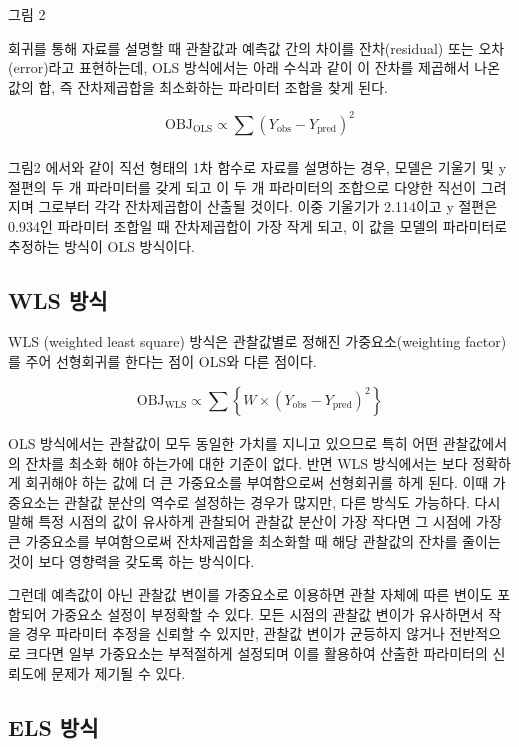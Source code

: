 \documentclass[
  10pt,
]{krantz}
\begin{document}
그림 2

회귀를 통해 자료를 설명할 때 관찰값과 예측값 간의 차이를 잔차(residual) 또는 오차(error)라고 표현하는데, OLS
방식에서는 아래 수식과 같이 이 잔차를 제곱해서 나온 값의 합, 즉 잔차제곱합을 최소화하는 파라미터 조합을 찾게 된다.

\[\text{OBJ}_{\text{OLS}} \propto \sum_{}^{}{(Y_{\text{obs}} - Y_{\text{pred}})}^{2}\]

그림2 에서와 같이 직선 형태의 1차 함수로 자료를 설명하는 경우, 모델은 기울기 및 y 절편의 두 개 파라미터를 갖게 되고 이
두 개 파라미터의 조합으로 다양한 직선이 그려지며 그로부터 각각 잔차제곱합이 산출될 것이다. 이중 기울기가 2.114이고 y
절편은 0.934인 파라미터 조합일 때 잔차제곱합이 가장 작게 되고, 이 값을 모델의 파라미터로 추정하는 방식이 OLS
방식이다.

\hypertarget{wls-uxbc29uxc2dd}{%
\subsection{WLS 방식}\label{wls-uxbc29uxc2dd}}

WLS (weighted least square) 방식은 관찰값별로 정해진 가중요소(weighting factor)를 주어
선형회귀를 한다는 점이 OLS와 다른 점이다.

\[\text{OBJ}_{\text{WLS}} \propto \sum_{}^{}\left\{ W \times {(Y_{\text{obs}} - Y_{\text{pred}})}^{2} \right\}\]

OLS 방식에서는 관찰값이 모두 동일한 가치를 지니고 있으므로 특히 어떤 관찰값에서의 잔차를 최소화 해야 하는가에 대한 기준이
없다. 반면 WLS 방식에서는 보다 정확하게 회귀해야 하는 값에 더 큰 가중요소를 부여함으로써 선형회귀를 하게 된다. 이때
가중요소는 관찰값 분산의 역수로 설정하는 경우가 많지만, 다른 방식도 가능하다. 다시 말해 특정 시점의 값이 유사하게 관찰되어
관찰값 분산이 가장 작다면 그 시점에 가장 큰 가중요소를 부여함으로써 잔차제곱합을 최소화할 때 해당 관찰값의 잔차를 줄이는
것이 보다 영향력을 갖도록 하는 방식이다.

그런데 예측값이 아닌 관찰값 변이를 가중요소로 이용하면 관찰 자체에 따른 변이도 포함되어 가중요소 설정이 부정확할 수 있다. 모든
시점의 관찰값 변이가 유사하면서 작을 경우 파라미터 추정을 신뢰할 수 있지만, 관찰값 변이가 균등하지 않거나 전반적으로 크다면
일부 가중요소는 부적절하게 설정되며 이를 활용하여 산출한 파라미터의 신뢰도에 문제가 제기될 수 있다.

\hypertarget{els-uxbc29uxc2dd}{%
\subsection{ELS 방식}\label{els-uxbc29uxc2dd}}
\end{document}
